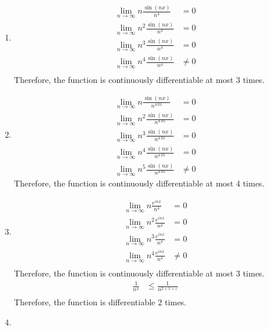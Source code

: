 \documentclass[fleqn, a4paper, 11pt, oneside]{amsart}
\theoremstyle{definition}
\theoremstyle{theorem}
\begin{document}
\begin{solution}
	\begin{enumerate}[leftmargin=*]
		\item
			\begin{align*}
				\lim\limits_{n \to \infty} n \frac{\sin(n x)}{n^4}   & = 0    \\
				\lim\limits_{n \to \infty} n^2 \frac{\sin(n x)}{n^4} & = 0    \\
				\lim\limits_{n \to \infty} n^3 \frac{\sin(n x)}{n^4} & = 0    \\
				\lim\limits_{n \to \infty} n^4 \frac{\sin(n x)}{n^4} & \neq 0 \\
			\end{align*}
			Therefore, the function is continuously differentiable at most 3 times.
		\item
			\begin{align*}
				\lim\limits_{n \to \infty} n \frac{\sin(n x)}{n^{4.01}}   & = 0 \\
				\lim\limits_{n \to \infty} n^2 \frac{\sin(n x)}{n^{4.01}} & = 0 \\
				\lim\limits_{n \to \infty} n^3 \frac{\sin(n x)}{n^{4.01}} & = 0 \\
				\lim\limits_{n \to \infty} n^4 \frac{\sin(n x)}{n^{4.01}} & = 0 \\
				\lim\limits_{n \to \infty} n^5 \frac{\sin(n x)}{n^{4.01}} & \neq 0
			\end{align*}
			Therefore, the function is continuously differentiable at most 4 times.
		\item
			\begin{align*}
				\lim\limits_{n \to \infty} n \frac{e^{i n x}}{n^4}   & = 0    \\
				\lim\limits_{n \to \infty} n^2 \frac{e^{i n x}}{n^4} & = 0    \\
				\lim\limits_{n \to \infty} n^3 \frac{e^{i n x}}{n^4} & = 0    \\
				\lim\limits_{n \to \infty} n^4 \frac{e^{i n x}}{n^4} & \neq 0 \\
			\end{align*}
			Therefore, the function is continuously differentiable at most 3 times.
			\begin{align*}
				\frac{1}{n^4} & \le \frac{1}{n^{2 + 1 + \varepsilon}} \\
			\end{align*}
			Therefore, the function is differentiable 2 times.
		\item
			\begin{align*}

\end{align*}
\end{enumerate}
\end{solution}
\end{document}
